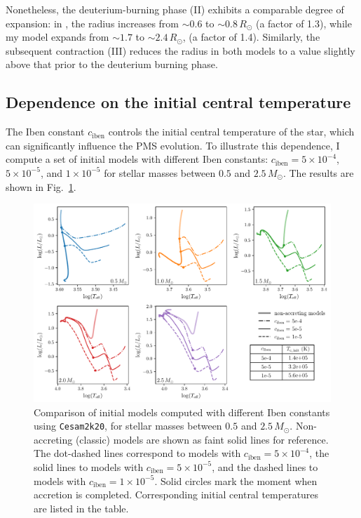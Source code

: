 \documentclass[12pt,a4paper]{article}
\newcommand{\mr}{\mathrm}
\begin{document}
Nonetheless, the deuterium-burning phase (II) exhibits a comparable degree of expansion: in \textcite{KunitomoEtAl2017}, the radius increases from $\sim 0.6$ to $\sim 0.8\,R_\odot$ (a factor of 1.3), while my model expands from $\sim 1.7$ to $\sim 2.4\,R_\odot$, (a factor of 1.4). Similarly, the subsequent contraction (III) reduces the radius in both models to a value slightly above that prior to the deuterium burning phase.

\subsection{Dependence on the initial central temperature}
\label{sec:initial_models}

The Iben constant $c_\mr{iben}$ controls the initial central temperature of the star, which can significantly influence the PMS evolution. To illustrate this dependence, I compute a set of initial models with different Iben constants: $c_\mr{iben} = 5 \times 10^{-4}$, $5 \times 10^{-5}$, and $1 \times 10^{-5}$ for stellar masses between $0.5$ and $2.5\,M_\odot$. The results are shown in Fig.~\ref{fig:comp_iben}.

\begin{figure}[htbp]
  \centering
  \includegraphics[width=\textwidth,keepaspectratio]{ciben_mass_init.pdf}
  \caption{Comparison of initial models computed with different Iben constants using \texttt{Cesam2k20}, for stellar masses between $0.5$ and $2.5\,M_\odot$. Non-accreting (classic) models are shown as faint solid lines for reference. The dot-dashed lines correspond to models with $c_\mr{iben} = 5\times10^{-4}$, the solid lines to models with $c_\mr{iben} = 5\times10^{-5}$, and the dashed lines to models with $c_\mr{iben} = 1\times10^{-5}$. Solid circles mark the moment when accretion is completed. Corresponding initial central temperatures are listed in the table.} 
  \label{fig:comp_iben}
\end{figure}
\end{document}
